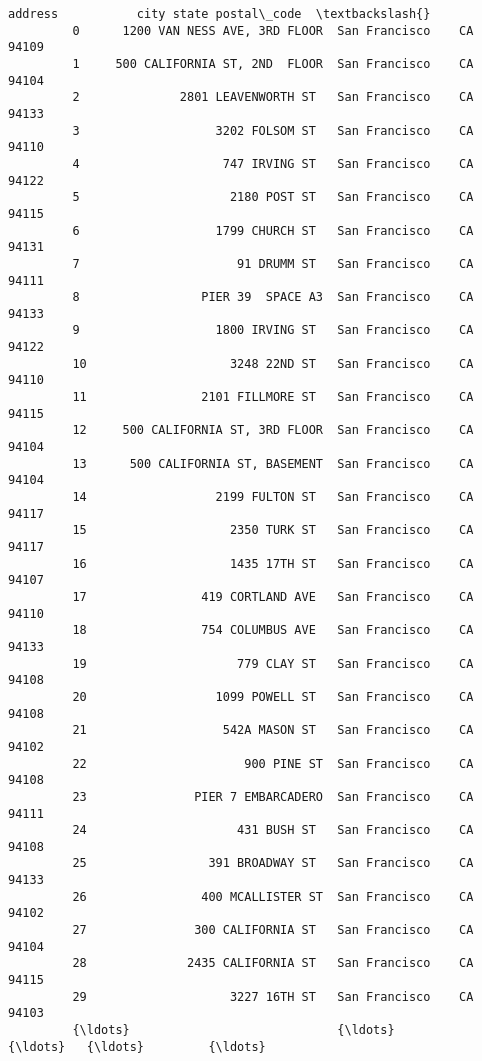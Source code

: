 \documentclass[11pt]{article}
\begin{document}
\begin{Verbatim}[commandchars=\\\{\}]
                                     address           city state postal\_code  \textbackslash{}
         0      1200 VAN NESS AVE, 3RD FLOOR  San Francisco    CA       94109   
         1     500 CALIFORNIA ST, 2ND  FLOOR  San Francisco    CA       94104   
         2              2801 LEAVENWORTH ST   San Francisco    CA       94133   
         3                   3202 FOLSOM ST   San Francisco    CA       94110   
         4                    747 IRVING ST   San Francisco    CA       94122   
         5                     2180 POST ST   San Francisco    CA       94115   
         6                   1799 CHURCH ST   San Francisco    CA       94131   
         7                      91 DRUMM ST   San Francisco    CA       94111   
         8                 PIER 39  SPACE A3  San Francisco    CA       94133   
         9                   1800 IRVING ST   San Francisco    CA       94122   
         10                    3248 22ND ST   San Francisco    CA       94110   
         11                2101 FILLMORE ST   San Francisco    CA       94115   
         12     500 CALIFORNIA ST, 3RD FLOOR  San Francisco    CA       94104   
         13      500 CALIFORNIA ST, BASEMENT  San Francisco    CA       94104   
         14                  2199 FULTON ST   San Francisco    CA       94117   
         15                    2350 TURK ST   San Francisco    CA       94117   
         16                    1435 17TH ST   San Francisco    CA       94107   
         17                419 CORTLAND AVE   San Francisco    CA       94110   
         18                754 COLUMBUS AVE   San Francisco    CA       94133   
         19                     779 CLAY ST   San Francisco    CA       94108   
         20                  1099 POWELL ST   San Francisco    CA       94108   
         21                   542A MASON ST   San Francisco    CA       94102   
         22                      900 PINE ST  San Francisco    CA       94108   
         23               PIER 7 EMBARCADERO  San Francisco    CA       94111   
         24                     431 BUSH ST   San Francisco    CA       94108   
         25                 391 BROADWAY ST   San Francisco    CA       94133   
         26                400 MCALLISTER ST  San Francisco    CA       94102   
         27               300 CALIFORNIA ST   San Francisco    CA       94104   
         28              2435 CALIFORNIA ST   San Francisco    CA       94115   
         29                    3227 16TH ST   San Francisco    CA       94103   
         {\ldots}                             {\ldots}            {\ldots}   {\ldots}         {\ldots}   

\end{Verbatim}
\end{document}
